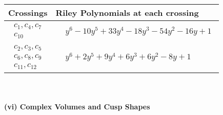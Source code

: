 \documentclass[1p]{elsarticle_modified}
\theoremstyle{definition}
\begin{document}
\begin{tabular}{m{50pt}|m{274pt}}
Crossings & \hspace{64pt}Riley Polynomials at each crossing \\
\hline $$\begin{aligned}c_{1},c_{4},c_{7}\\c_{10}\end{aligned}$$&$\begin{aligned}
&y^6-10 y^5+33 y^4-18 y^3-54 y^2-16 y+1
\end{aligned}$\\
\hline $$\begin{aligned}c_{2},c_{3},c_{5}\\c_{6},c_{8},c_{9}\\c_{11},c_{12}\end{aligned}$$&$\begin{aligned}
&y^6+2 y^5+9 y^4+6 y^3+6 y^2-8 y+1
\end{aligned}$\\
\hline
\end{tabular}\\~\\
\newpage\flushleft \textbf{(vi) Complex Volumes and Cusp Shapes}
\end{document}
